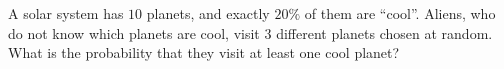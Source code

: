 A solar system has $10$ planets, and exactly $20\%$ of them are ``cool''. Aliens, who do not know which planets are cool, visit $3$ different planets chosen at random. What is the probability that they visit at least one cool planet?
